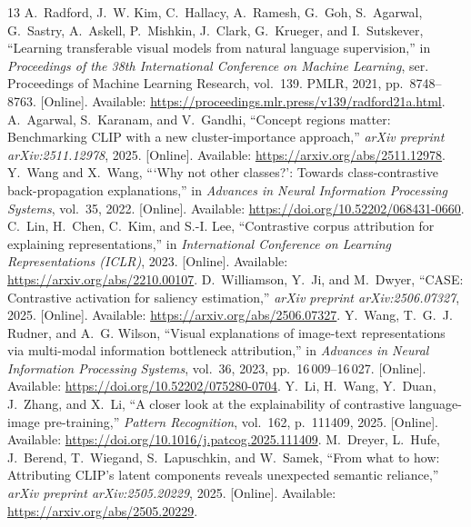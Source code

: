 \begin{thebibliography}{13}
A.~Radford, J.~W. Kim, C.~Hallacy, A.~Ramesh, G.~Goh, S.~Agarwal, G.~Sastry,
A.~Askell, P.~Mishkin, J.~Clark, G.~Krueger, and I.~Sutskever, ``Learning
transferable visual models from natural language supervision,'' in
\emph{Proceedings of the 38th International Conference on Machine Learning},
ser. Proceedings of Machine Learning Research, vol.~139. PMLR, 2021,
pp.~8748--8763. [Online]. Available:
\url{https://proceedings.mlr.press/v139/radford21a.html}.
A.~Agarwal, S.~Karanam, and V.~Gandhi, ``Concept regions matter: Benchmarking
{CLIP} with a new cluster-importance approach,'' \emph{arXiv preprint arXiv:2511.12978},
2025. [Online]. Available:
\url{https://arxiv.org/abs/2511.12978}.
Y.~Wang and X.~Wang, ```Why not other classes?': Towards class-contrastive
back-propagation explanations,'' in \emph{Advances in Neural Information
Processing Systems}, vol.~35, 2022. [Online]. Available:
\url{https://doi.org/10.52202/068431-0660}.
C.~Lin, H.~Chen, C.~Kim, and S.-I. Lee, ``Contrastive corpus attribution for
explaining representations,'' in \emph{International Conference on Learning
Representations (ICLR)}, 2023. [Online]. Available:
\url{https://arxiv.org/abs/2210.00107}.
D.~Williamson, Y.~Ji, and M.~Dwyer, ``{CASE}: Contrastive activation for saliency
estimation,'' \emph{arXiv preprint arXiv:2506.07327}, 2025. [Online]. Available:
\url{https://arxiv.org/abs/2506.07327}.
Y.~Wang, T.~G.~J. Rudner, and A.~G. Wilson, ``Visual explanations of image-text
representations via multi-modal information bottleneck attribution,'' in
\emph{Advances in Neural Information Processing Systems}, vol.~36, 2023,
pp.~16\,009--16\,027. [Online]. Available:
\url{https://doi.org/10.52202/075280-0704}.
Y.~Li, H.~Wang, Y.~Duan, J.~Zhang, and X.~Li, ``A closer look at the explainability
of contrastive language-image pre-training,'' \emph{Pattern Recognition},
vol.~162, p.~111409, 2025. [Online]. Available:
\url{https://doi.org/10.1016/j.patcog.2025.111409}.
M.~Dreyer, L.~Hufe, J.~Berend, T.~Wiegand, S.~Lapuschkin, and W.~Samek, ``From
what to how: Attributing {CLIP}'s latent components reveals unexpected semantic
reliance,'' \emph{arXiv preprint arXiv:2505.20229}, 2025. [Online]. Available:
\url{https://arxiv.org/abs/2505.20229}.

\end{thebibliography}
